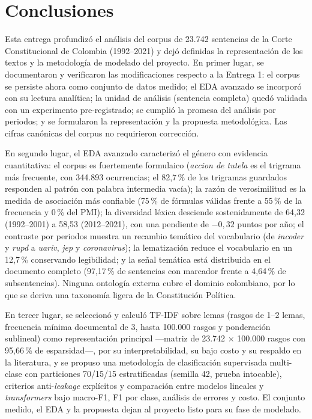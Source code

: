 \documentclass[11pt]{tg_usta}
\begin{document}
\section{Conclusiones}
\label{sec:conclusiones}

Esta entrega profundizó el análisis del corpus de 23.742 sentencias de la Corte Constitucional de Colombia (1992--2021) y dejó definidas la representación de los textos y la metodología de modelado del proyecto. En primer lugar, se documentaron y verificaron las modificaciones respecto a la Entrega 1: el corpus se persiste ahora como conjunto de datos medido; el EDA avanzado se incorporó con su lectura analítica; la unidad de análisis (sentencia completa) quedó validada con un experimento pre-registrado; se cumplió la promesa del análisis por periodos; y se formularon la representación y la propuesta metodológica. Las cifras canónicas del corpus no requirieron corrección.

En segundo lugar, el EDA avanzado caracterizó el género con evidencia cuantitativa: el corpus es fuertemente formulaico (\emph{accion de tutela} es el trigrama más frecuente, con 344.893 ocurrencias; el 82,7\,\% de los trigramas guardados responden al patrón con palabra intermedia vacía); la razón de verosimilitud es la medida de asociación más confiable (75\,\% de fórmulas válidas frente a 55\,\% de la frecuencia y 0\,\% del PMI); la diversidad léxica desciende sostenidamente de 64,32 (1992--2001) a 58,53 (2012--2021), con una pendiente de $-0,32$ puntos por año; el contraste por periodos muestra un recambio temático del vocabulario (de \emph{incoder} y \emph{rupd} a \emph{uariv}, \emph{jep} y \emph{coronavirus}); la lematización reduce el vocabulario en un 12,7\,\% conservando legibilidad; y la señal temática está distribuida en el documento completo (97,17\,\% de sentencias con marcador frente a 4,64\,\% de subsentencias). Ninguna ontología externa cubre el dominio colombiano, por lo que se deriva una taxonomía ligera de la Constitución Política.

En tercer lugar, se seleccionó y calculó TF-IDF sobre lemas (rasgos de 1--2 lemas, frecuencia mínima documental de 3, hasta 100.000 rasgos y ponderación sublineal) como representación principal ---matriz de 23.742 $\times$ 100.000 rasgos con 95,66\,\% de esparsidad---, por su interpretabilidad, su bajo costo y su respaldo en la literatura, y se propuso una metodología de clasificación supervisada multi-clase con particiones 70/15/15 estratificadas (semilla 42, prueba intocable), criterios anti-\emph{leakage} explícitos y comparación entre modelos lineales y \emph{transformers} bajo macro-F1, F1 por clase, análisis de errores y costo. El conjunto medido, el EDA y la propuesta dejan al proyecto listo para su fase de modelado.


{\footnotesize}
\end{document}
